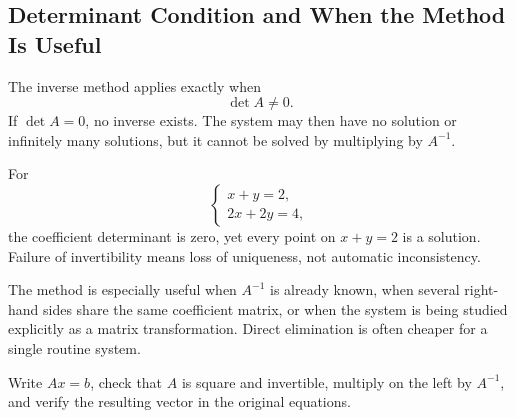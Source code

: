 \subsection{Determinant Condition and When the Method Is Useful}

The inverse method applies exactly when
\[
\det A\neq0.
\]
If $\det A=0$, no inverse exists. The system may then have no solution or infinitely many solutions, but it cannot be solved by multiplying by $A^{-1}$.

\begin{examplebox}
For
\[
\begin{cases}
x+y=2,\\
2x+2y=4,
\end{cases}
\]
the coefficient determinant is zero, yet every point on $x+y=2$ is a solution. Failure of invertibility means loss of uniqueness, not automatic inconsistency.
\end{examplebox}

\begin{interpretationbox}
The method is especially useful when $A^{-1}$ is already known, when several right-hand sides share the same coefficient matrix, or when the system is being studied explicitly as a matrix transformation. Direct elimination is often cheaper for a single routine system.
\end{interpretationbox}

\begin{summarybox}
Write $Ax=b$, check that $A$ is square and invertible, multiply on the left by $A^{-1}$, and verify the resulting vector in the original equations.
\end{summarybox}
